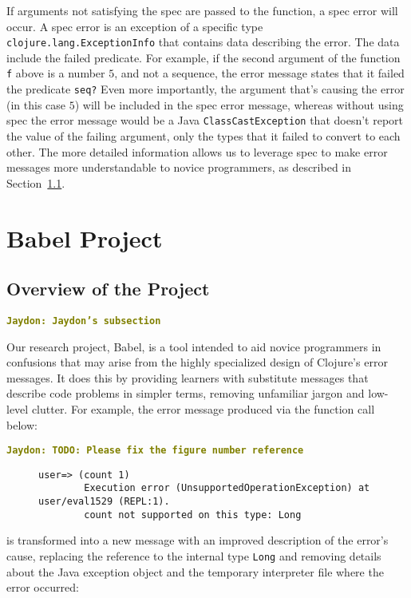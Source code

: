 \documentclass[12pt]{article}
\newcommand{\comment}[1]{{\bf \tt  {#1}}}
\newcommand{\jscomment}[1]{\textcolor{olive}{\comment{Jaydon: {#1}}}}
\begin{document}
If arguments not satisfying the spec are passed to the function, a spec error will occur. 
A spec error is an exception of a specific type \texttt{clojure.lang.ExceptionInfo} that contains data describing the error. 
The data include the failed predicate.
For example, if the second argument of the function 
\texttt{f} above is a number $5$, and not a sequence, the error message states that it failed the predicate \texttt{seq?}
Even more importantly, the argument that's causing the error (in this case $5$) will be included in the spec error message, whereas without using spec the error message would be a Java \texttt{ClassCastException} that doesn't report the value of the failing argument, only the types that it failed to convert to each other. 
The more detailed information allows us to leverage spec to make error messages more understandable to novice programmers, as described in Section~\ref{subsec:overview}. 

\section{Babel Project}\label{sec:babel}
\subsection{Overview of the Project}\label{subsec:overview}
\jscomment{Jaydon's subsection}

Our research project, Babel, is a tool intended to aid novice programmers in confusions that may arise from the highly specialized design of Clojure's error messages. It does this by providing learners with substitute messages that describe code problems in simpler terms, removing unfamiliar jargon and low-level clutter. For example, the error message produced via the function call below:

\jscomment{TODO: Please fix the figure number reference}

\begin{figure}[h]
	\centering
	\begin{lstlisting}[breaklines=true, basicstyle=\ttfamily]
        user=> (count 1)
        Execution error (UnsupportedOperationException) at user/eval1529 (REPL:1).
        count not supported on this type: Long
	\end{lstlisting}
\end{figure}

is transformed into a new message with an improved description of the error's cause, replacing the reference to the internal type \verb|Long| and removing details about the Java exception object and the temporary interpreter file where the error occurred:
\end{document}
